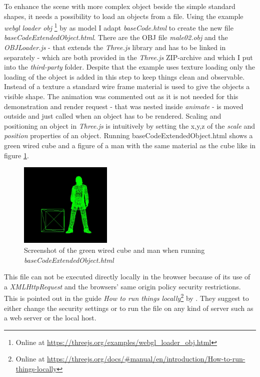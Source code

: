 To enhance the scene with more complex object beside the simple standard shapes, it needs a possibility to load an objects from a file. Using the example \textit{webgl loader obj} \footnote{Online at \url{https://threejs.org/examples/webgl_loader_obj.html}} by \cite{Mr.doob2012Three.js/examples:Webgl_loader_obj.html} as model I adapt \textit{baseCode.html} to create the new file  \textit{baseCodeExtendedObject.html}. 
There are the OBJ file \textit{male02.obj} and the \textit{OBJLoader.js} - that extends the \textit{Three.js} library and has to be linked in separately -  which are both provided in the \textit{Three.js} ZIP-archive and which I put into the \textit{third-party} folder. Despite that the example uses texture loading  only the loading of the object is added in this step to keep things clean and observable. Instead of a texture a standard wire frame material is used to give the objects a visible shape. The animation was commented out as it is not needed for this demonstration and render request - that was nested inside \textit{animate} - is moved outside and just called when an object has to be rendered. Scaling and positioning an object in \textit{Three.js} is intuitively by setting the x,y,z of the \textit{scale} and \textit{position} properties of an object. Running {baseCodeExtendedObject.html} shows a green wired cube and a figure of a man with the same material as the cube like in figure \ref{fig:cube and man}. 

\begin{figure}[h]
    \centering
    \includegraphics[height=4cm]{Document/Figures/chapter2/ScreenshotLoadedObject.jpg}
    \caption[Screenshot of the green wired cube and man]{Screenshot of the green wired cube and man when running \mbox{\textit{baseCodeExtendedObject.html}}}
    \label{fig:cube and man}
\end{figure}

This file can not be executed directly locally in the browser because of its use of a \textit{XMLHttpRequest} and the browsers' same origin policy security restrictions. This is pointed out in the guide \textit{How to run things locally}\footnote{Online at \url{https://threejs.org/docs/\#manual/en/introduction/How-to-run-things-locally}} by \cite{Anaranjo972018Three.js/docs/manual:How-to-run-things-locally.html}. They suggest to either change the security settings or to run the file on any kind of server such as a web server or the local host.

